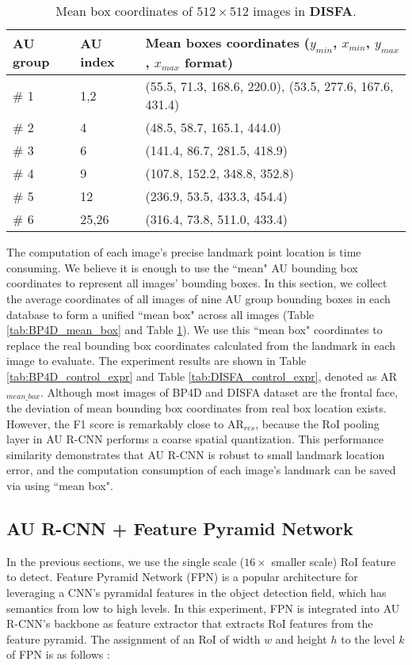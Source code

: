 \documentclass[5p,twocolumn]{elsarticle}
\begin{document}
\begin{table}[htp]
	\scriptsize	
	\setlength{\abovecaptionskip}{0pt} 
	\caption{Mean box coordinates of $512\times 512$ images in \textbf{DISFA}.}
	\label{tab:DISFA_mean_box}
	\centering
	\tabcolsep=0.05cm
	\begin{tabular}{lll}
		\toprule
		
		AU group & AU index & Mean boxes coordinates ($y_{min}$, $x_{min}$, $y_{max}$, $x_{max}$ format) \\
		\midrule
		\# 1 & 1,2 & (55.5, 71.3, 168.6, 220.0), (53.5, 277.6, 167.6, 431.4)  \\
		\# 2 & 4 & (48.5, 58.7, 165.1, 444.0) \\
		\# 3 & 6 & (141.4, 86.7, 281.5, 418.9) \\
		\# 4 & 9 & (107.8, 152.2, 348.8, 352.8) \\
		\# 5 & 12 & (236.9, 53.5, 433.3, 454.4) \\
		\# 6 & 25,26 & (316.4, 73.8, 511.0, 433.4) \\
		\bottomrule
	\end{tabular}
\end{table}
The computation of each image's precise landmark point location is time consuming. We believe it is enough to use the ``mean" AU bounding box coordinates to represent all images' bounding boxes. In this section, we collect the average coordinates of all images of nine AU group bounding boxes in each database to form a unified ``mean box" across all images (Table \ref{tab:BP4D_mean_box} and Table \ref{tab:DISFA_mean_box}). We use this ``mean box" coordinates to replace the real bounding box coordinates calculated from the landmark in each image to evaluate. The experiment results are shown in Table \ref{tab:BP4D_control_expr} and Table \ref{tab:DISFA_control_expr}, denoted as AR$_{mean\_box}$. Although most images of BP4D and DISFA dataset are the frontal face, the deviation of mean bounding box coordinates from real box location exists. However, the F1 score is remarkably close to AR$_{res}$, because the RoI pooling layer in AU R-CNN performs a coarse spatial quantization. This performance similarity demonstrates that AU R-CNN is robust to small landmark location error, and the computation consumption of each image's landmark can be saved via using ``mean box".

\subsection{AU R-CNN + Feature Pyramid Network}
In the previous sections, we use the single scale ($16\times$ smaller scale) RoI feature to detect. Feature Pyramid Network (FPN) \cite{lin2017feature} is a popular architecture for leveraging a CNN's pyramidal features in the object detection field, which has semantics from low to high levels. In this experiment, FPN is integrated into AU R-CNN's backbone as feature extractor that extracts RoI features from the feature pyramid. The assignment of an RoI of width $w$ and height $h$ to the level $k$ of FPN is as follows \cite{lin2017feature}:
\end{document}
